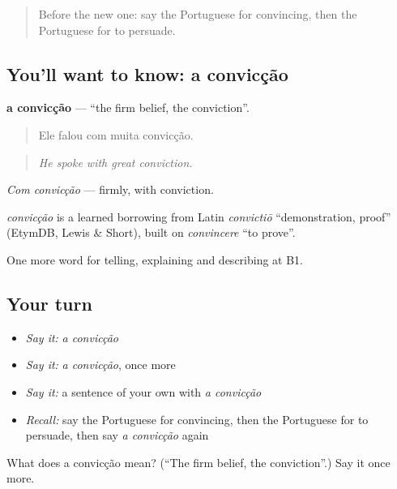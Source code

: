\label{lesson:PT-C337-conviccao}



\begin{quote}
Before the new one: say the Portuguese for convincing, then the Portuguese for to persuade.
\end{quote}

\subsection*{You'll want to know: a convicção}
\textbf{a convicção} — \textquotedblleft{}the firm belief, the conviction\textquotedblright{}.

\begin{quote}
Ele falou com muita convicção.
\end{quote}

\begin{quote}
\emph{He spoke with great conviction.}
\end{quote}

\emph{Com convicção} — firmly, with conviction.

\begin{cousinweb}
\emph{convicção} is a learned borrowing from Latin \emph{convictiō} \textquotedblleft{}demonstration, proof\textquotedblright{} (EtymDB, Lewis \& Short), built on \emph{convincere} \textquotedblleft{}to prove\textquotedblright{}.
\end{cousinweb}

\begin{grammarlens}[title={What you've built}]
One more word for telling, explaining and describing at B1.
\end{grammarlens}

\subsection*{Your turn}
\begin{itemize}
\raggedright
  \item \emph{Say it:} \emph{a convicção}
  \item \emph{Say it:} \emph{a convicção}, once more
  \item \emph{Say it:} a sentence of your own with \emph{a convicção}
  \item \emph{Recall:} say the Portuguese for convincing, then the Portuguese for to persuade, then say \emph{a convicção} again
\end{itemize}

\begin{tcolorbox}[breakable,colback=teal!4,colframe=teal!35!black,title={Before you move on}]
What does a convicção mean? (\textquotedblleft{}The firm belief, the conviction\textquotedblright{}.) Say it once more.
\end{tcolorbox}
